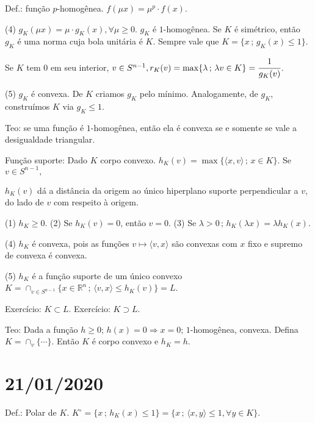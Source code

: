 \documentclass[12pt]{article}
\begin{document}
Def.: fun\c{c}\~ao $p$-homog\^enea. $f(\mu x) = \mu^p \cdot f(x)$.

(4) $g_K(\mu x) = \mu \cdot g_K(x),\forall\mu\ge 0$. $g_K$ \'e $1$-homog\^enea. Se $K$ \'e sim\'etrico, ent\~ao $g_K$ \'e uma norma cuja bola unit\'aria \'e $K$. Sempre vale que $K = \{ x\,;\,g_K(x) \le 1 \}$.

Se $K$ tem $0$ em seu interior, $v\in S^{n - 1}, r_K(v) = \max \{ \lambda\,;\,\lambda v \in K \} = \cfrac{1}{g_K(v)}$.

(5) $g_K$ \'e convexa. De $K$ criamos $g_K$ pelo m\'inimo. Analogamente, de $g_K$, constru\'imos $K$ via $g_K \le 1$.

Teo: se uma fun\c{c}\~ao \'e $1$-homog\^enea, ent\~ao ela \'e convexa se e somente se vale a desigualdade triangular.

Fun\c{c}\~ao suporte: Dado $K$ corpo convexo. $h_K(v) = \max \{ \langle x, v \rangle\,;\,x \in K \}$. Se $v\in S^{n - 1},$

$h_K(v)$ d\'a a dist\^ancia da origem ao \'unico hiperplano suporte perpendicular a $v$, do lado de $v$ com respeito \`a origem.

(1) $h_K \ge 0$. (2) Se $h_K(v) = 0$, ent\~ao $v = 0$. (3) Se $\lambda > 0\,;\,h_K(\lambda x) = \lambda h_K(x)$.

(4) $h_K$ \'e convexa, pois as fun\c{c}\~oes $v \mapsto \langle v, x\rangle$ s\~ao convexas com $x$ fixo e supremo de convexa \'e convexa.

(5) $h_K$ \'e a fun\c{c}\~ao suporte de um \'unico convexo $K = \cap_{v \in S^{n - 1}} \{ x \in \mathbb{R}^n\,;\,\langle v, x \rangle \le h_K(v) \} = L$.

Exerc\'icio: $K \subset L$. Exerc\'icio: $K \supset L$.

Teo: Dada a fun\c{c}\~ao $h \ge 0$; $h(x) = 0 \Rightarrow x = 0$; $1$-homog\^enea, convexa. Defina $K = \cap_v \{ \cdots \}$. Ent\~ao $K$ \'e corpo convexo e $h_K = h$.

\vspace{100mm}

\section{21/01/2020}

\begin{flushright}
\end{flushright}

Def.: Polar de $K$. $K^\circ = \{ x \,;\, h_K(x) \le 1 \} = \{ x\,;\,\langle x, y \rangle \le 1, \forall y \in K \}$.
\end{document}
